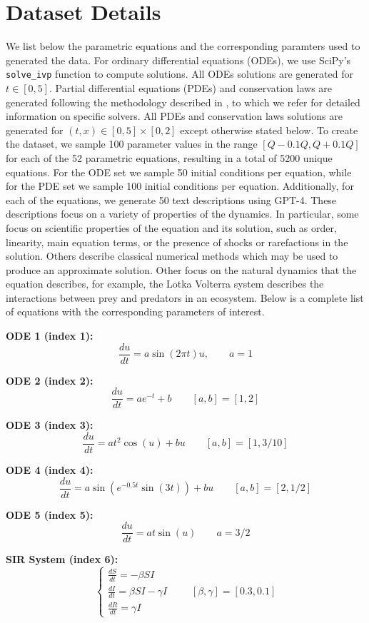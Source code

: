 
\section{Dataset Details}\label{sec:dataset_details}
We list below the parametric equations and the corresponding paramters used to generated the data. For ordinary differential equations (ODEs), we use SciPy's \texttt{solve\_ivp} function to compute solutions. All ODEs solutions are generated for $t\in[0,5]$. Partial differential equations (PDEs) and conservation laws are generated following the methodology described in \cite{sun2024towards}, to which we refer for detailed information on specific solvers. All PDEs and conservation laws solutions are generated for $(t,x)\in [0,5]\times [0,2]$ except otherwise stated below. To create the dataset, we sample 100 parameter values in the range $[Q-0.1Q, Q+0.1Q]$ for each of the 52 parametric equations, resulting in a total of 5200 unique equations. For the ODE set we sample 50 initial conditions per equation, while for the PDE set we sample 100 initial conditions per equation.  Additionally, for each of the equations, we generate 50 text descriptions using GPT-4. These descriptions focus on a variety of properties of the dynamics. In particular, some focus on scientific properties of the equation and its solution, such as order, linearity, main equation terms, or the presence of shocks or rarefactions in the solution. Others describe classical numerical methods which may be used to produce an approximate solution. Other focus on the natural dynamics that the equation describes, for example, the Lotka Volterra system describes the interactions between prey and predators in an ecosystem.
Below is a complete list of equations with the corresponding parameters of interest.
\bigskip

\textbf{ODE 1 (index 1):} 
\[
\frac{du}{dt} = a \sin(2 \pi t) u, \qquad a = 1
\]

\textbf{ODE 2 (index 2):} 
\[
\frac{du}{dt} = a e^{-t} + b \qquad [a,b] = [1,2]
\]

\textbf{ODE 3 (index 3):} 
\[
\frac{du}{dt} = a t^2 \cos(u) + b u \qquad [a,b] = [1,3/10]
\]

\textbf{ODE 4 (index 4):} 
\[
\frac{du}{dt} = a \sin\left( e^{-0.5 t} \sin(3 t) \right) + b u \qquad [a,b] = [2, 1/2]
\]

\textbf{ODE 5 (index 5):} 
\[
\frac{du}{dt} = a t \sin(u) \qquad a = 3/2
\]

\textbf{SIR System (index 6):} 
\[
\begin{cases}
\frac{dS}{dt} = -\beta S I \\
\frac{dI}{dt} = \beta S I - \gamma I \\
\frac{dR}{dt} = \gamma I
\end{cases} \qquad [\beta, \gamma] = [0.3,0.1]
\]

